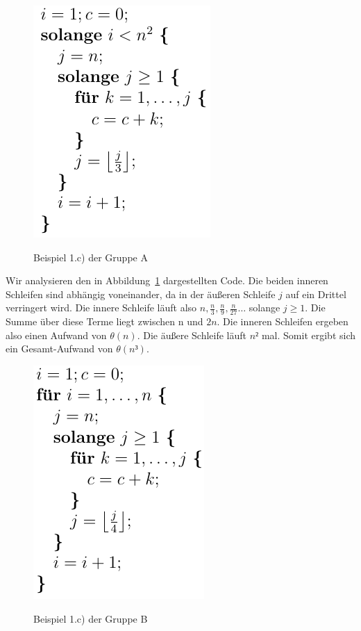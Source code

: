 \documentclass[a4paper, 12pt]{article}
\begin{document}
\begin{figure}[htbp]
	\caption{Beispiel 1.c) der Gruppe A}
	\vskip 0.2cm
	\centering
	\includegraphics{Figures/Test_2008-04-25_1Ac}
	\label{figure:Test_2008-04-25_1Ac}
\end{figure}

Wir analysieren den in Abbildung~\ref{figure:Test_2008-04-25_1Ac} dargestellten Code. Die beiden inneren Schleifen sind abhängig voneinander, da in der äußeren Schleife $j$ auf ein Drittel verringert wird. Die innere Schleife läuft also $n,\frac{n}{3},\frac{n}{9},\frac{n}{27}\dots$ solange $j≥1$. Die Summe über diese Terme liegt zwischen n und $2n$. Die inneren Schleifen ergeben also einen Aufwand von $θ\left(n\right)$. Die äußere Schleife läuft $n²$ mal. Somit ergibt sich ein Gesamt-Aufwand von $θ\left(n³\right)$.

\begin{figure}[htbp]
	\caption{Beispiel 1.c) der Gruppe B}
	\vskip 0.2cm
	\centering
	\includegraphics{Figures/Test_2008-04-25_1Bc}
	\label{figure:Test_2008-04-25_1Bc}
\end{figure}
\end{document}
